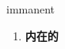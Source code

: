 
\begin{frame}
{\huge immanent}
\begin{center}
\begin{enumerate}\Large
  \item \textbf{内在的}
\end{enumerate}
\end{center}
\end{frame}
